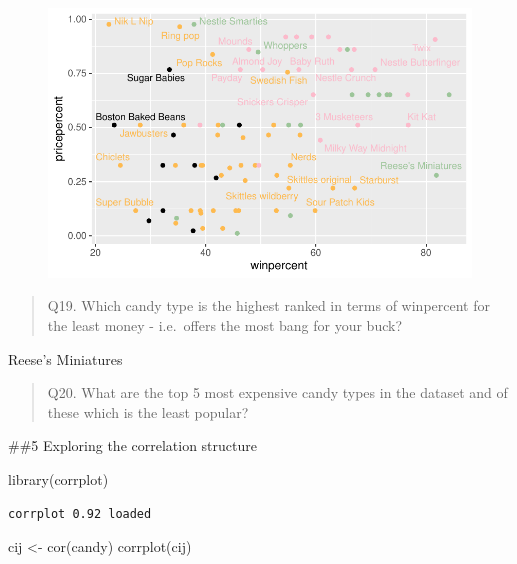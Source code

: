 \documentclass[
  letterpaper,
  DIV=11,
  numbers=noendperiod]{scrartcl}
\newenvironment{Shaded}{\begin{snugshade}}{\end{snugshade}}
\newcommand{\FunctionTok}[1]{\textcolor[rgb]{0.28,0.35,0.67}{#1}}
\newcommand{\NormalTok}[1]{\textcolor[rgb]{0.00,0.23,0.31}{#1}}
\newcommand{\OtherTok}[1]{\textcolor[rgb]{0.00,0.23,0.31}{#1}}
\begin{document}
\begin{figure}[H]

{\centering \includegraphics{class09_files/figure-pdf/unnamed-chunk-24-1.pdf}

}

\end{figure}

\begin{quote}
Q19. Which candy type is the highest ranked in terms of winpercent for
the least money - i.e.~offers the most bang for your buck?
\end{quote}

Reese's Miniatures

\begin{quote}
Q20. What are the top 5 most expensive candy types in the dataset and of
these which is the least popular?
\end{quote}

\#\#5 Exploring the correlation structure

\begin{Shaded}
\begin{Highlighting}[]
\FunctionTok{library}\NormalTok{(corrplot)}
\end{Highlighting}
\end{Shaded}

\begin{verbatim}
corrplot 0.92 loaded
\end{verbatim}

\begin{Shaded}
\begin{Highlighting}[]
\NormalTok{cij }\OtherTok{\textless{}{-}} \FunctionTok{cor}\NormalTok{(candy)}
\FunctionTok{corrplot}\NormalTok{(cij)}
\end{Highlighting}
\end{Shaded}
\end{document}
